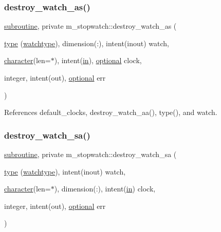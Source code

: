 \subsubsection{\texorpdfstring{destroy\+\_\+watch\+\_\+as()}{destroy\_watch\_as()}}
{\footnotesize\ttfamily \hyperlink{M__stopwatch_83_8txt_acfbcff50169d691ff02d4a123ed70482}{subroutine}, private m\+\_\+stopwatch\+::destroy\+\_\+watch\+\_\+as (\begin{DoxyParamCaption}\item[{\hyperlink{stop__watch_83_8txt_a70f0ead91c32e25323c03265aa302c1c}{type} (\hyperlink{structm__stopwatch_1_1watchtype}{watchtype}), dimension(\+:), intent(inout)}]{watch,  }\item[{\hyperlink{option__stopwatch_83_8txt_abd4b21fbbd175834027b5224bfe97e66}{character}(len=$\ast$), intent(\hyperlink{M__journal_83_8txt_afce72651d1eed785a2132bee863b2f38}{in}), \hyperlink{option__stopwatch_83_8txt_aa4ece75e7acf58a4843f70fe18c3ade5}{optional}}]{clock,  }\item[{integer, intent(out), \hyperlink{option__stopwatch_83_8txt_aa4ece75e7acf58a4843f70fe18c3ade5}{optional}}]{err }\end{DoxyParamCaption})\hspace{0.3cm}{\ttfamily [private]}}



References default\+\_\+clocks, destroy\+\_\+watch\+\_\+aa(), type(), and watch.

\mbox{\label{namespacem__stopwatch_a56c7eb5332f1d56b46bfc9a3a9b10134}} 
\subsubsection{\texorpdfstring{destroy\+\_\+watch\+\_\+sa()}{destroy\_watch\_sa()}}
{\footnotesize\ttfamily \hyperlink{M__stopwatch_83_8txt_acfbcff50169d691ff02d4a123ed70482}{subroutine}, private m\+\_\+stopwatch\+::destroy\+\_\+watch\+\_\+sa (\begin{DoxyParamCaption}\item[{\hyperlink{stop__watch_83_8txt_a70f0ead91c32e25323c03265aa302c1c}{type} (\hyperlink{structm__stopwatch_1_1watchtype}{watchtype}), intent(inout)}]{watch,  }\item[{\hyperlink{option__stopwatch_83_8txt_abd4b21fbbd175834027b5224bfe97e66}{character}(len=$\ast$), dimension(\+:), intent(\hyperlink{M__journal_83_8txt_afce72651d1eed785a2132bee863b2f38}{in})}]{clock,  }\item[{integer, intent(out), \hyperlink{option__stopwatch_83_8txt_aa4ece75e7acf58a4843f70fe18c3ade5}{optional}}]{err }\end{DoxyParamCaption})\hspace{0.3cm}{\ttfamily [private]}}



